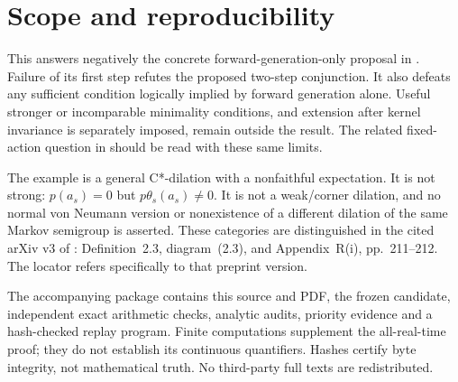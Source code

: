 \documentclass[11pt]{article}
\begin{document}
\section*{Scope and reproducibility}
This answers negatively the concrete forward-generation-only proposal
in \cite{owr}. Failure of its first step refutes the proposed two-step
conjunction. It also defeats any sufficient condition logically implied
by forward generation alone. Useful stronger or incomparable minimality
conditions, and extension after kernel invariance is separately imposed,
remain outside the result. The related fixed-action question in
\cite[Section~5]{ss} should be read with these same limits.

The example is a general C*-dilation with a nonfaithful expectation.
It is not strong: $p(a_s)=0$ but $p\theta_s(a_s)\ne0$. It is not a
weak/corner dilation, and no normal von Neumann version or nonexistence
of a different dilation of the same Markov semigroup is asserted.
These categories are distinguished in the cited arXiv v3 of
\cite{shalit}: Definition~2.3, diagram~(2.3), and Appendix~R(i),
pp.~211--212. The locator refers specifically to that preprint version.

The accompanying package contains this source and PDF, the frozen
candidate, independent exact arithmetic checks, analytic audits,
priority evidence and a hash-checked replay program. Finite computations
supplement the all-real-time proof; they do not establish its continuous
quantifiers. Hashes certify byte integrity, not mathematical truth.
No third-party full texts are redistributed.
\end{document}
